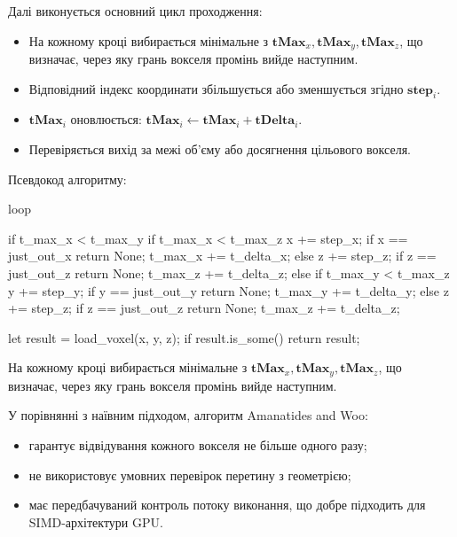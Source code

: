     Далі виконується основний цикл проходження:
    \begin{itemize}[itemsep=0pt, topsep=0pt, label=$\diamond$]
        \item На кожному кроці вибирається мінімальне з $\mathbf{tMax}_x, \mathbf{tMax}_y, \mathbf{tMax}_z$, що визначає, через яку грань вокселя промінь вийде наступним.
        \item Відповідний індекс координати збільшується або зменшується згідно $\mathbf{step}_i$.
        \item $\mathbf{tMax}_i$ оновлюється: $\mathbf{tMax}_i \leftarrow \mathbf{tMax}_i + \mathbf{tDelta}_i$.
        \item Перевіряється вихід за межі об'єму або досягнення цільового вокселя.
    \end{itemize}

    Псевдокод алгоритму:
    \begin{rustcode}
    loop {
        if t_max_x < t_max_y {
            if t_max_x < t_max_z {
                x += step_x;
                if x == just_out_x {
                    return None; 
                }
                t_max_x += t_delta_x;
            } else {
                z += step_z;
                if z == just_out_z {
                    return None; 
                }
                t_max_z += t_delta_z;
            }
        } else {
            if t_max_y < t_max_z {
                y += step_y;
                if y == just_out_y {
                    return None; 
                }
                t_max_y += t_delta_y;
            } else {
                z += step_z;
                if z == just_out_z {
                    return None; 
                }
                t_max_z += t_delta_z;
            }
        }

        let result = load_voxel(x, y, z);
        if result.is_some() {
            return result;
        }
    }
    \end{rustcode}

\newpage
На кожному кроці вибирається мінімальне з $\mathbf{tMax}_x, \mathbf{tMax}_y, \mathbf{tMax}_z$, що визначає, через яку грань вокселя промінь вийде наступним.

У порівнянні з наївним підходом, алгоритм Amanatides and Woo:
\begin{itemize}[itemsep=0pt, topsep=0pt, label=$\diamond$]
    \item гарантує відвідування кожного вокселя не більше одного разу;
    \item не використовує умовних перевірок перетину з геометрією;
    \item має передбачуваний контроль потоку виконання, що добре підходить для SIMD-архітектури GPU.
\end{itemize}

